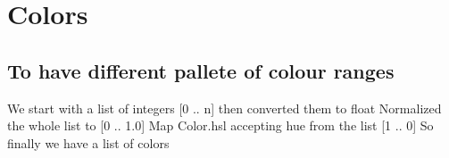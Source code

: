 \hypertarget{colors}{%
\section{Colors}\label{colors}}

\hypertarget{to-have-different-pallete-of-colour-ranges}{%
\subsection{To have different pallete of colour
ranges}\label{to-have-different-pallete-of-colour-ranges}}

\begin{Shaded}
\begin{Highlighting}[]
  \OperatorTok{=}  \OperatorTok{|}  \OperatorTok{|} 
\end{Highlighting}
\end{Shaded}

We start with a list of integers {[}0 .. n{]} then converted them to
float Normalized the whole list to {[}0 .. 1.0{]} Map Color.hsl
accepting hue from the list {[}1 .. 0{]} So finally we have a list of
colors

